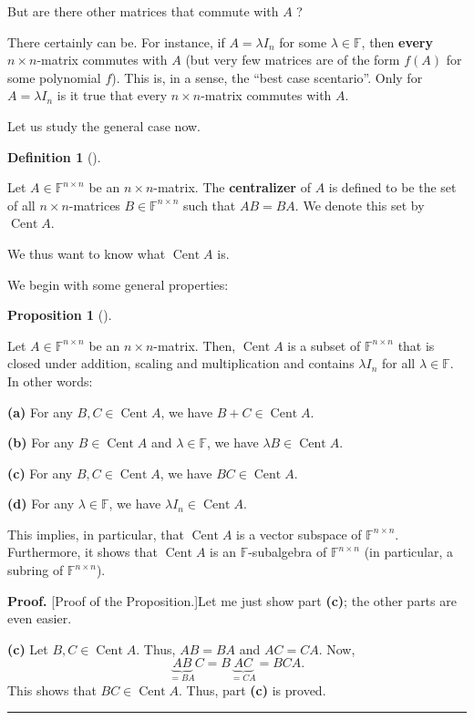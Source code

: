 \documentclass[numbers=enddot,12pt,final,onecolumn,notitlepage]{scrartcl}%
\numberwithin{exer}{subsection}
\theoremstyle{definition}
\newtheorem{prop}[theo]{Proposition}
\newenvironment{proposition}[1][]
{\begin{prop}[#1]\begin{leftbar}}
{\end{leftbar}\end{prop}}
\newtheorem{defi}[theo]{Definition}
\newenvironment{definition}[1][]
{\begin{defi}[#1]\begin{leftbar}}
{\end{leftbar}\end{defi}}
\newenvironment{proof}[1][Proof]{\noindent\textbf{#1.} }{\ \rule{0.5em}{0.5em}}
\begin{document}
But are there other matrices that commute with $A$ ?

There certainly can be. For instance, if $A=\lambda I_{n}$ for some
$\lambda\in\mathbb{F}$, then \textbf{every} $n\times n$-matrix commutes with
$A$ (but very few matrices are of the form $f\left(  A\right)  $ for some
polynomial $f$). This is, in a sense, the \textquotedblleft best case
scentario\textquotedblright. Only for $A=\lambda I_{n}$ is it true that every
$n\times n$-matrix commutes with $A$.

Let us study the general case now.

\begin{definition}
Let $A\in\mathbb{F}^{n\times n}$ be an $n\times n$-matrix. The
\textbf{centralizer} of $A$ is defined to be the set of all $n\times
n$-matrices $B\in\mathbb{F}^{n\times n}$ such that $AB=BA$. We denote this set
by $\operatorname*{Cent}A$.
\end{definition}

We thus want to know what $\operatorname*{Cent}A$ is.

We begin with some general properties:

\begin{proposition}
Let $A\in\mathbb{F}^{n\times n}$ be an $n\times n$-matrix. Then,
$\operatorname*{Cent}A$ is a subset of $\mathbb{F}^{n\times n}$ that is closed
under addition, scaling and multiplication and contains $\lambda I_{n}$ for
all $\lambda\in\mathbb{F}$. In other words:

\textbf{(a)} For any $B,C\in\operatorname*{Cent}A$, we have $B+C\in
\operatorname*{Cent}A$.

\textbf{(b)} For any $B\in\operatorname*{Cent}A$ and $\lambda\in\mathbb{F}$,
we have $\lambda B\in\operatorname*{Cent}A$.

\textbf{(c)} For any $B,C\in\operatorname*{Cent}A$, we have $BC\in
\operatorname*{Cent}A$.

\textbf{(d)} For any $\lambda\in\mathbb{F}$, we have $\lambda I_{n}%
\in\operatorname*{Cent}A$.
\end{proposition}

This implies, in particular, that $\operatorname*{Cent}A$ is a vector subspace
of $\mathbb{F}^{n\times n}$. Furthermore, it shows that $\operatorname*{Cent}%
A$ is an $\mathbb{F}$-subalgebra of $\mathbb{F}^{n\times n}$ (in particular, a
subring of $\mathbb{F}^{n\times n}$).

\begin{proof}
[Proof of the Proposition.]Let me just show part \textbf{(c)}; the other parts
are even easier.

\textbf{(c)} Let $B,C\in\operatorname*{Cent}A$. Thus, $AB=BA$ and $AC=CA$.
Now,%
\[
\underbrace{AB}_{=BA}C=B\underbrace{AC}_{=CA}=BCA.
\]
This shows that $BC\in\operatorname*{Cent}A$. Thus, part \textbf{(c)} is proved.
\end{proof}
\end{document}

